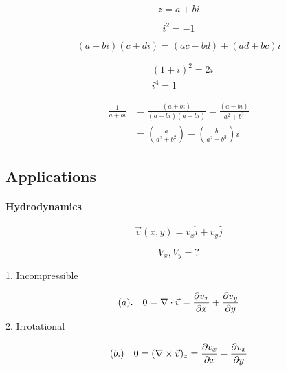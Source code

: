 \documentclass[svgnames]{article}   	%
\begin{document}
\[
z = a + bi
\]

\[
 i^2 = -1
\]

\[
  (a + bi)(c + di) = (ac - bd) + (ad + bc)i
\]
\vspace{5px}
\begin{tcolorbox}[title = Example]

  \begin{align*}
    &(1+i)^2 = 2i \\
    &i^4 = 1
  \end{align*}

\end{tcolorbox}
\vspace{5px}

\begin{align*}
  \frac{1}{a+bi} &= \frac{(a+bi)}{(a-bi)(a+bi)} = \frac{(a-bi)}{a^2 + b^2} \\
                 &= \left(\frac{a}{a^2+b^2}\right) - \left(\frac{b}{a^2 + b^3}\right)i
\end{align*}

\subsection{Applications}

\paragraph{Hydrodynamics}


\[
\vec{v}(x,y) = v_x \hat{i} + v_y \hat{j}
\]

\begin{tcolorbox}[title = Problem]	
  
  \[
  V_x, V_y = ? 
  \]
  
\end{tcolorbox}	

\begin{tcolorbox}[title = Model]

  1. Incompressible
  
   \[
     (a). \hspace{10px} 0 = \nabla \cdot \vec{v} = \frac{\partial v_x}{\partial x} + \frac{\partial
    v_y}{\partial y} 
  \] 
  2. Irrotational

  \[
    (b.) \hspace{10px} 0 = (\nabla \times \vec{v})_z = \frac{\partial v_x}{\partial x}
    - \frac{\partial v_x}{\partial y} 
  \]

\end{tcolorbox}
\end{document}

